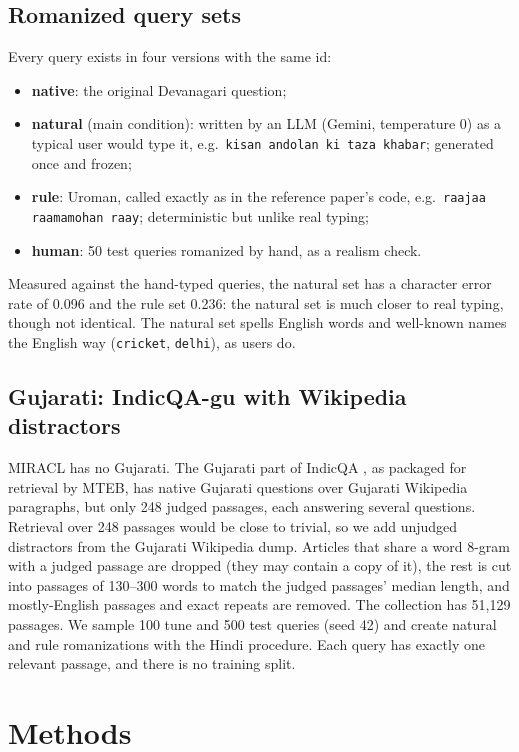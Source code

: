 \documentclass[11pt,a4paper]{article}
\newcommand{\rom}[1]{\texttt{#1}}          %
\begin{document}
\subsection{Romanized query sets}
Every query exists in four versions with the same id:
\begin{itemize}
  \item \textbf{native}: the original Devanagari question;
  \item \textbf{natural} (main condition): written by an LLM (Gemini, temperature 0) as a
        typical user would type it, e.g.\ \rom{kisan andolan ki taza khabar}; generated once and
        frozen;
  \item \textbf{rule}: Uroman, called exactly as in the reference paper's code, e.g.\
        \rom{raajaa raamamohan raay}; deterministic but unlike real typing;
  \item \textbf{human}: 50 test queries romanized by hand, as a realism check.
\end{itemize}
Measured against the hand-typed queries, the natural set has a character error rate of 0.096
and the rule set 0.236: the natural set is much closer to real typing, though not identical.
The natural set spells English words and well-known names the English way (\rom{cricket},
\rom{delhi}), as users do.

\subsection{Gujarati: IndicQA-gu with Wikipedia distractors}
MIRACL has no Gujarati. The Gujarati part of IndicQA \citep{doddapaneni2023indicxtreme}, as
packaged for retrieval by MTEB, has native Gujarati questions over Gujarati Wikipedia
paragraphs, but only 248 judged passages, each answering several questions. Retrieval over
248 passages would be close to trivial, so we add unjudged distractors from the Gujarati
Wikipedia dump. Articles that share a word 8-gram with a judged passage are dropped (they may
contain a copy of it), the rest is cut into passages of 130--300 words to match the judged
passages' median length, and mostly-English passages and exact repeats are removed. The
collection has 51,129 passages. We sample 100 tune and 500 test queries (seed 42) and create
natural and rule romanizations with the Hindi procedure. Each query has exactly one relevant
passage, and there is no training split.

\section{Methods}
\end{document}

